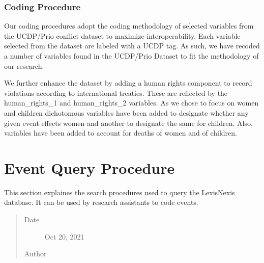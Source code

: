 \documentclass[letterpaper,10pt,english]{sphinxmanual}
\begin{document}
\subsection{Coding Procedure}
\label{\detokenize{introduction:coding-procedure}}
\sphinxAtStartPar
Our coding procedures adopt the coding methodology of selected variables from the UCDP/Prio conflict dataset to maximize interoperability.   Each variable selected from the dataset are labeled with a UCDP tag.  As such, we have recoded a number of variables found in the UCDP/Prio Dataset to fit the methodology of our research.

\sphinxAtStartPar
We further enhance the dataset by adding a human rights component to record violations according to international treaties.  These are reflected by the human\_rights\_1 and human\_rights\_2 variables.  As we chose to focus on women and children dichotomous variables have been added to designate whether any given event effects women and another to designate the same for children.  Also, variables have been added to account for deaths of women and of children.


\chapter{Event Query Procedure}
\label{\detokenize{event_query_procedure:event-query-procedure}}\label{\detokenize{event_query_procedure:id1}}\label{\detokenize{event_query_procedure::doc}}
\begin{sphinxShadowBox}

\sphinxAtStartPar
This section explaines the search procedures used to query the Lexis\sphinxhyphen{}Nexis database. It can be used by research assistants to code events.
\begin{quote}\begin{description}
\item[{Date}] \leavevmode
\sphinxAtStartPar
Oct 20, 2021

\item[{Author}] \leavevmode
\sphinxAtStartPar
{}

\end{description}\end{quote}
\end{sphinxShadowBox}
\end{document}
